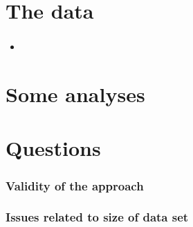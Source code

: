 \documentclass[]{beamer}
\begin{document}
%	


\section{The data}

\begin{frame}
	\frametitle{}
	\begin{itemize}
	\item 
	\end{itemize}
\end{frame}

\section{Some analyses}



\section{Questions}

\begin{frame}
	\frametitle{Validity of the approach}
\end{frame}


\begin{frame}
	\frametitle{Issues related to size of data set}
\end{frame}


\begin{frame}
	\frametitle{}
\end{frame}
\end{document}
